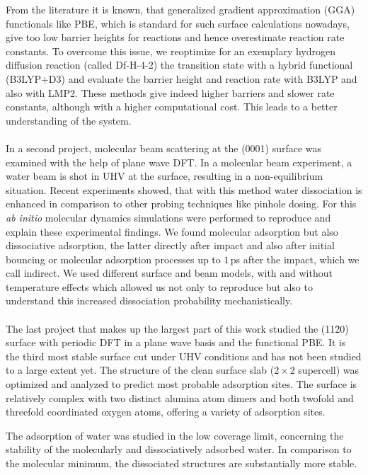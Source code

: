 \documentclass[11pt,DIV=13,a4paper,headinclude]{scrartcl}
\begin{document}
From the literature it is known, that generalized gradient approximation (GGA) functionals like PBE, which is standard for such surface calculations nowadays, give too low barrier heights for reactions and hence overestimate reaction rate constants.
To overcome this issue, we reoptimize for an exemplary hydrogen diffusion reaction (called Df-H-4-2) the transition state with a hybrid functional (B3LYP+D3) and evaluate the barrier height and reaction rate with B3LYP and also with LMP2.
These methods give indeed higher barriers and slower rate constants, although with a higher computational cost.
This leads to a better understanding of the system.
\\
\\
In a second project, molecular beam scattering at the (0001) surface was examined with the help of plane wave DFT.
In a molecular beam experiment, a water beam is shot in UHV at the surface, resulting in a non-equilibrium situation.
Recent experiments showed, that with this method water dissociation is enhanced in comparison to other probing techniques like pinhole dosing.
For this \textit{ab initio} molecular dynamics simulations were performed to reproduce and explain these experimental findings.
We found molecular adsorption but also dissociative adsorption, the latter directly after impact and also after initial bouncing or molecular adsorption processes up to $1\,$ps after the impact, which we call indirect.
We used different surface and beam models, with and without temperature effects which allowed us not only to reproduce but also to understand this increased dissociation probability mechanistically.
\\
\\
The last project that makes up the largest part of this work studied the (11\=20) surface with periodic DFT in a plane wave basis and the functional PBE.
It is the third most stable surface cut under UHV conditions and has not been studied to a large extent yet.
The structure of the clean surface slab ($2\times 2$ supercell) was optimized and analyzed to predict most probable adsorption sites.
The surface is relatively complex with two distinct alumina atom dimers and both twofold and threefold coordinated oxygen atoms, offering a variety of adsorption sites.

The adsorption of water was studied in the low coverage limit, concerning the stability of the molecularly and dissociatively adsorbed water.
In comparison to the molecular minimum, the dissociated structures are substantially more stable.
\end{document}
